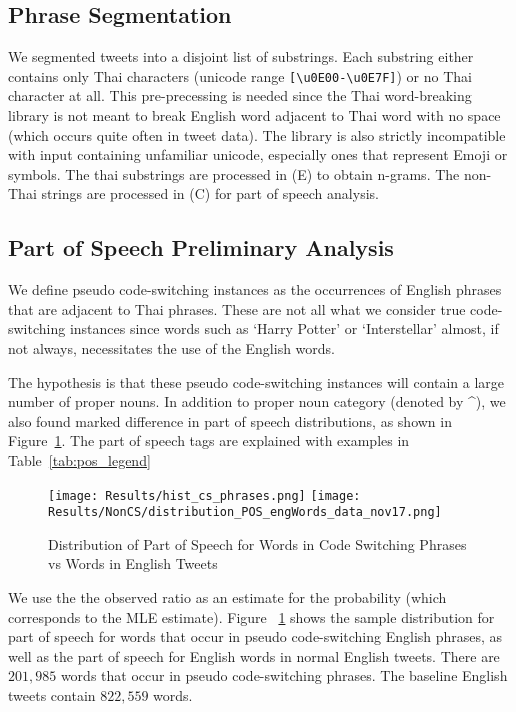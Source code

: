 \documentclass[conference]{IEEEtran}
\begin{document}


\subsection{Phrase Segmentation}
We segmented tweets into a disjoint list of substrings. Each substring either contains only Thai characters (unicode range \verb|[\u0E00-\u0E7F]|) or no Thai character at all. This pre-precessing is needed since the Thai word-breaking library is not meant to break English word  adjacent to Thai word with no space (which occurs quite often in tweet data). The library is also strictly incompatible with input containing unfamiliar unicode, especially ones that represent Emoji or symbols. The thai substrings are processed in (E) to obtain n-grams. The non-Thai strings are processed in (C) for part of speech analysis.



\subsection{Part of Speech Preliminary Analysis}
We define pseudo code-switching instances as the occurrences of English phrases that are adjacent to Thai phrases.  These are not all what we consider   true code-switching instances since words such as `Harry Potter' or `Interstellar' almost, if not always, necessitates the use of the English words. 

The hypothesis is that these pseudo code-switching instances will contain a large number of proper nouns. In addition to proper noun category (denoted by \^{}), we also found marked difference in  part of speech distributions, as shown in Figure~\ref{fig:pos_phrases}. The part of speech  tags are explained with examples in Table~\ref{tab:pos_legend}




\begin{figure}[H]
	\centering
	\texttt{[image: Results/hist\_cs\_phrases.png]}
	\texttt{[image: Results/NonCS/distribution\_POS\_engWords\_data\_nov17.png]}
	\caption{Distribution of Part of Speech for Words in Code Switching Phrases vs Words in English Tweets }
	\label{fig:pos_phrases}
\end{figure}

We use the the observed ratio as an estimate for the probability (which corresponds to the MLE estimate). Figure ~\ref{fig:pos_phrases} shows the sample distribution  for  part of speech  for words that occur in pseudo code-switching English phrases, as well as the part of speech for English words in normal English tweets. There are $201,985$ words that occur in pseudo code-switching phrases. The baseline English tweets contain $822,559$ words. 
\end{document}
